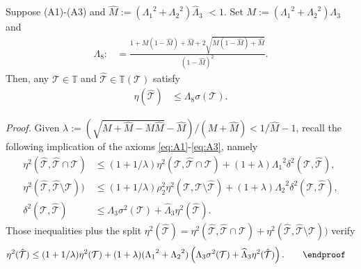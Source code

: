 \documentclass{siamltex1213}
\begin{document}
	\begin{theorem}[Quasimonotonicity] \label{thm:qmono}
			Suppose (A1)-(A3) and  $\widehat M:=({\ensuremath{\Lambda_{\mathrm{1}}}}^2+{\ensuremath{\Lambda_{\mathrm{2}}}}^2){\ensuremath{\widehat{\Lambda}_{\mathrm{3}}}}$ $<1$. Set $M:=({\ensuremath{\Lambda_{\mathrm{1}}}}^2+{\ensuremath{\Lambda_{\mathrm{2}}}}^2){\ensuremath{\Lambda_{\mathrm{3}}}}$ and
			\begin{align*}
			{\ensuremath{\Lambda_{\mathrm{8}}}}:&=\frac{1+M(1-{\ensuremath{\widehat{M}}})+{\ensuremath{\widehat{M}}} +2 \sqrt{M (1-{\ensuremath{\widehat{M}}})+{\ensuremath{\widehat{M}}}}}{(1-{\ensuremath{\widehat{M}}})^2}.
	\end{align*}
	Then, any ${\mathcal{T}} \in {\mathbb T}$ and ${\hat{\mathcal{T}}} \in {\mathbb T\left({\mathcal{T}}\right)}$ satisfy 
	\begin{align}\label{eq:qmono}
			\eta({\hat{\mathcal{T}}}) &\leq {\ensuremath{\Lambda_{\mathrm{8}}}} \sigma({\mathcal{T}}). 
	\end{align}
	\end{theorem}
\textit{Proof.}
		Given $	\lambda:=(\sqrt{M+{\ensuremath{\widehat{M}}}-M {\ensuremath{\widehat{M}}}}-{\ensuremath{\widehat{M}}})/(M+{\ensuremath{\widehat{M}}})<1/{\ensuremath{\widehat{M}}}-1$,
	recall the following implication of the axioms \eqref{eq:A1}-\eqref{eq:A3}, namely
	\begin{align*}
		\eta^2({\hat{\mathcal{T}}},{\hat{\mathcal{T}}} \cap {\mathcal{T}})&\leq (1+1/\lambda) \eta^2({\mathcal{T}},{\hat{\mathcal{T}}} \cap {\mathcal{T}}) + (1+\lambda){\ensuremath{\Lambda_{\mathrm{1}}}}^2 \delta^2({\mathcal{T}},{\hat{\mathcal{T}}}),
		\\
		\eta^2({\hat{\mathcal{T}}},{\hat{\mathcal{T}}} \setminus{\mathcal{T}})) & \leq (1+1/\lambda)\rho_{2}^2 \eta^2({\mathcal{T}}, {\mathcal{T}} \setminus {\hat{\mathcal{T}}}) +(1+\lambda) {\ensuremath{\Lambda_{\mathrm{2}}}}^2\delta^2({\mathcal{T}},{\hat{\mathcal{T}}}), 
		\\
	\delta^2({\mathcal{T}},{\hat{\mathcal{T}}}) &\leq {\ensuremath{\Lambda_{\mathrm{3}}}} \sigma^2({\mathcal{T}}) + {\ensuremath{\widehat{\Lambda}_{\mathrm{3}}}} \eta^2({\hat{\mathcal{T}}}).
	\end{align*}
	Those inequalities plus the split 
	$\eta^2({\hat{\mathcal{T}}})= \eta^2({\hat{\mathcal{T}}},{\hat{\mathcal{T}}} \cap {\mathcal{T}}) + \eta^2({\hat{\mathcal{T}}},{\hat{\mathcal{T}}} \setminus {\mathcal{T}}))$
	 verify
	\begin{align*}
		\eta^2({\hat{\mathcal{T}}}) &\leq  (1+1/\lambda)\eta^2({\mathcal{T}}) + (1+\lambda)({\ensuremath{\Lambda_{\mathrm{1}}}}^2+{\ensuremath{\Lambda_{\mathrm{2}}}}^2)\left({\ensuremath{\Lambda_{\mathrm{3}}}} \sigma^2({\mathcal{T}})+{\ensuremath{\widehat{\Lambda}_{\mathrm{3}}}} \eta^2({\hat{\mathcal{T}}})\right).\qquad \endproof
		\end{align*}
	
\end{document}
